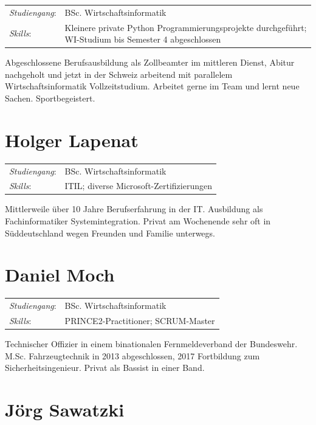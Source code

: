 \documentclass[a4paper,11pt,listof=numbered,glossary=totoc,parskip=half,toc=bib]{scrreprt}
\begin{document}
{\begin{tabularx}{\linewidth}{lX}
\toprule
\textit{Studiengang}: & BSc. Wirtschaftsinformatik\\

\textit{Skills}: & Kleinere private Python Programmierungsprojekte durchgeführt; WI-Studium bis Semester 4 abgeschlossen \\
\bottomrule
\end{tabularx}

Abgeschlossene Berufsausbildung als Zollbeamter im mittleren Dienst, Abitur nachgeholt und jetzt in der Schweiz arbeitend mit parallelem Wirtschaftsinformatik Vollzeitstudium. Arbeitet gerne im Team und lernt neue Sachen. Sportbegeistert.

\section{Holger Lapenat}


\begin{tabularx}{\linewidth}{lX}
\toprule
\textit{Studiengang}: & BSc. Wirtschaftsinformatik\\

\textit{Skills}: & ITIL; diverse Microsoft-Zertifizierungen \\
\bottomrule
\end{tabularx}

Mittlerweile über 10 Jahre Berufserfahrung in der IT. Ausbildung als Fachinformatiker Systemintegration. Privat am Wochenende sehr oft in Süddeutschland wegen Freunden und Familie unterwegs.
 


\section{Daniel Moch}

\begin{tabularx}{\linewidth}{lX}
\toprule
\textit{Studiengang}: & BSc. Wirtschaftsinformatik\\

\textit{Skills}: & PRINCE2-Practitioner; SCRUM-Master \\
\bottomrule
\end{tabularx}

Technischer Offizier in einem binationalen Fernmeldeverband der Bundeswehr. M.Sc. Fahrzeugtechnik in 2013 abgeschlossen, 2017 Fortbildung zum Sicherheitsingenieur. Privat als Bassist in einer Band.

\section{Jörg Sawatzki}

}
\end{document}
